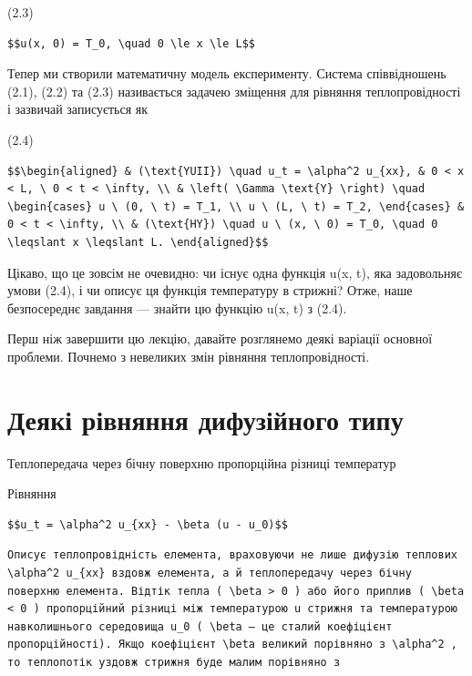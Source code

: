 \documentclass[
  ukrainian,
]{article}
\begin{document}
(2.3)

\begin{verbatim}
$$u(x, 0) = T_0, \quad 0 \le x \le L$$
\end{verbatim}

Тепер ми створили математичну модель експерименту. Система співвідношень
(2.1), (2.2) та (2.3) називається задачею зміщення для рівняння
теплопровідності і зазвичай записується як

(2.4)

\begin{verbatim}
$$\begin{aligned} & (\text{YUII}) \quad u_t = \alpha^2 u_{xx}, & 0 < x < L, \ 0 < t < \infty, \\ & \left( \Gamma \text{Y} \right) \quad \begin{cases} u \ (0, \ t) = T_1, \\ u \ (L, \ t) = T_2, \end{cases} & 0 < t < \infty, \\ & (\text{HY}) \quad u \ (x, \ 0) = T_0, \quad 0 \leqslant x \leqslant L. \end{aligned}$$
\end{verbatim}

Цікаво, що це зовсім не очевидно: чи існує одна функція u(x, t), яка
задовольняє умови (2.4), і чи описує ця функція температуру в стрижні?
Отже, наше безпосереднє завдання --- знайти цю функцію u(x, t) з (2.4).

Перш ніж завершити цю лекцію, давайте розглянемо деякі варіації основної
проблеми. Почнемо з невеликих змін рівняння теплопровідності.

\section{Деякі рівняння дифузійного
типу}\label{ux434ux435ux44fux43aux456-ux440ux456ux432ux43dux44fux43dux43dux44f-ux434ux438ux444ux443ux437ux456ux439ux43dux43eux433ux43e-ux442ux438ux43fux443}

Теплопередача через бічну поверхню пропорційна різниці температур

Рівняння

\begin{verbatim}
$$u_t = \alpha^2 u_{xx} - \beta (u - u_0)$$
\end{verbatim}

\begin{verbatim}
Описує теплопровідність елемента, враховуючи не лише дифузію теплових \alpha^2 u_{xx} вздовж елемента, а й теплопередачу через бічну поверхню елемента. Відтік тепла ( \beta > 0 ) або його приплив ( \beta < 0 ) пропорційний різниці між температурою u стрижня та температурою навколишнього середовища u_0 ( \beta — це сталий коефіцієнт пропорційності). Якщо коефіцієнт \beta великий порівняно з \alpha^2 , то теплопотік уздовж стрижня буде малим порівняно з
\end{verbatim}
\end{document}
